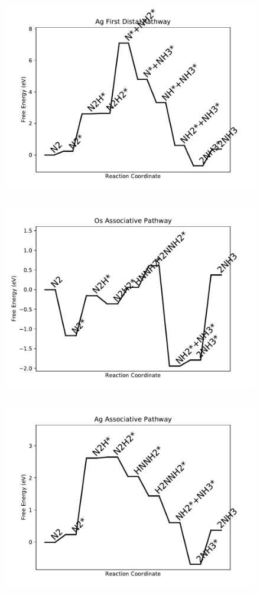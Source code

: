 \begin{figure}
\centering
\includegraphics[width=0.8\linewidth]{data/plots/Ag_distal_1.pdf}
\end{figure}

\begin{figure}
\centering
\includegraphics[width=0.8\linewidth]{data/plots/Os_associative.pdf}
\end{figure}

\begin{figure}
\centering
\includegraphics[width=0.8\linewidth]{data/plots/Ag_associative.pdf}
\end{figure}

